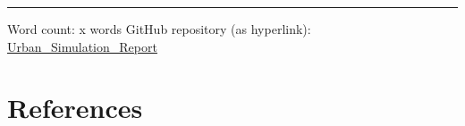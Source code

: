 \documentclass[
  12pt,
  a4paper,
  DIV=11,
  numbers=noendperiod]{scrartcl}
\begin{document}
\begin{center}\rule{0.5\linewidth}{0.5pt}\end{center}

Word count: x words GitHub repository (as hyperlink):
\href{https://github.com/sokimura39/Urban_Simulation_Report}{Urban\_Simulation\_Report}

\newpage{}

\hypertarget{references}{%
\section{References}\label{references}}
\end{document}
